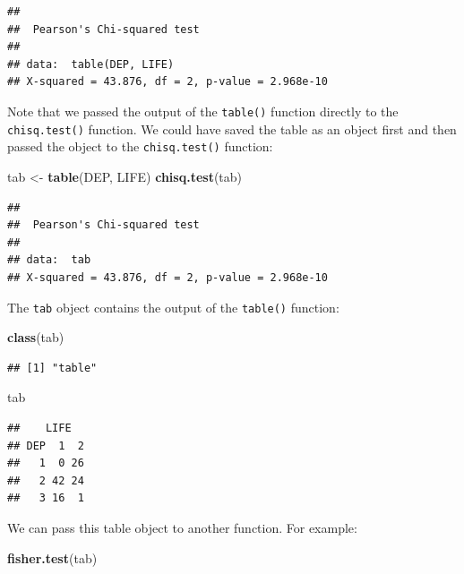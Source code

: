 \documentclass[]{book}
\newenvironment{Shaded}{\begin{snugshade}}{\end{snugshade}}
\newcommand{\KeywordTok}[1]{\textcolor[rgb]{0.13,0.29,0.53}{\textbf{#1}}}
\newcommand{\StringTok}[1]{\textcolor[rgb]{0.31,0.60,0.02}{#1}}
\newcommand{\NormalTok}[1]{#1}
\theoremstyle{definition}
\theoremstyle{definition}
\theoremstyle{definition}
\theoremstyle{remark}
\begin{document}
\begin{verbatim}
## 
##  Pearson's Chi-squared test
## 
## data:  table(DEP, LIFE)
## X-squared = 43.876, df = 2, p-value = 2.968e-10
\end{verbatim}

Note that we passed the output of the \texttt{table()} function directly
to the \texttt{chisq.test()} function. We could have saved the table as
an object first and then passed the object to the \texttt{chisq.test()}
function:

\begin{Shaded}
\begin{Highlighting}[]
\NormalTok{tab <-}\StringTok{ }\KeywordTok{table}\NormalTok{(DEP, LIFE)}
\KeywordTok{chisq.test}\NormalTok{(tab)}
\end{Highlighting}
\end{Shaded}

\begin{verbatim}
## 
##  Pearson's Chi-squared test
## 
## data:  tab
## X-squared = 43.876, df = 2, p-value = 2.968e-10
\end{verbatim}

The \texttt{tab} object contains the output of the \texttt{table()}
function:

\begin{Shaded}
\begin{Highlighting}[]
\KeywordTok{class}\NormalTok{(tab)}
\end{Highlighting}
\end{Shaded}

\begin{verbatim}
## [1] "table"
\end{verbatim}

\begin{Shaded}
\begin{Highlighting}[]
\NormalTok{tab}
\end{Highlighting}
\end{Shaded}

\begin{verbatim}
##    LIFE
## DEP  1  2
##   1  0 26
##   2 42 24
##   3 16  1
\end{verbatim}

We can pass this table object to another function. For example:

\begin{Shaded}
\begin{Highlighting}[]
\KeywordTok{fisher.test}\NormalTok{(tab)}
\end{Highlighting}
\end{Shaded}
\end{document}
